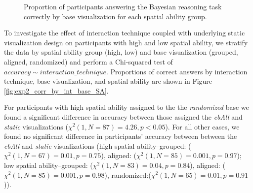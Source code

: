 \begin{figure}[h]
    \centering
    \caption{Proportion of participants answering the Bayesian reasoning task correctly by base visualization for each spatial ability group.}
    \label{fig:exp2_bases_by_sa}
\end{figure}

To investigate the effect of interaction technique coupled with underlying static visualization design on participants with high and low spatial ability, we stratify the data by spatial ability group (high, low) and base visualization (grouped, aligned, randomized) and perform a Chi-squared test of $accuracy \sim interaction\_technique$.
Proportions of correct answers by interaction technique, base visualization, and spatial ability are shown in Figure \ref{fig:exp2_corr_by_int_base_SA}. 

For participants with high spatial ability assigned to the the \textit{randomized} base we found a significant difference in accuracy between those assigned the \textit{cbAll} and \textit{static} visualizations ($\chi^2(1, N = 87) = 4.26, p < 0.05$). For all other cases, we found no significant difference in participants' accuracy between between the \textit{cbAll} and \textit{static} visualizations (high spatial ability--grouped: ($\chi^2(1, N = 67) = 0.01, p = 0.75$), aligned: ($\chi^2(1, N = 85) = 0.001, p = 0.97$); low spatial ability--grouped: ($\chi^2(1, N = 83) = 0.04, p = 0.84$), aligned: ($\chi^2(1, N = 85) = 0.001, p = 0.98$), randomized:($\chi^2(1, N = 65) = 0.01, p = 0.91$)). 


